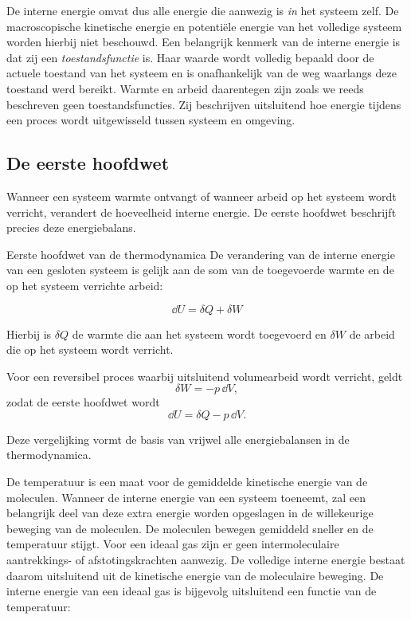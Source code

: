 De interne energie omvat dus alle energie die aanwezig is \emph{in} het systeem zelf. De macroscopische kinetische energie en potentiële energie van het volledige systeem worden hierbij niet beschouwd. Een belangrijk kenmerk van de interne energie is dat zij een \emph{toestandsfunctie} is. Haar waarde wordt volledig bepaald door de actuele toestand van het systeem en is onafhankelijk van de weg waarlangs deze toestand werd bereikt. Warmte en arbeid daarentegen zijn zoals we reeds beschreven geen toestandsfuncties. Zij beschrijven uitsluitend hoe energie tijdens een proces wordt uitgewisseld tussen systeem en omgeving.

\subsection{De eerste hoofdwet}

Wanneer een systeem warmte ontvangt of wanneer arbeid op het systeem wordt verricht, verandert de hoeveelheid interne energie. De eerste hoofdwet beschrijft precies deze energiebalans.

\begin{definitie}{Eerste hoofdwet van de thermodynamica}
De verandering van de interne energie van een gesloten systeem is gelijk aan de som van de toegevoerde warmte en de op het systeem verrichte arbeid:

\begin{equation}
\boxed{
\dd U = \delta Q + \delta W
}
\end{equation}

Hierbij is $\delta Q$ de warmte die aan het systeem wordt toegevoerd en $\delta W$ de arbeid die op het systeem wordt verricht.
\end{definitie}

Voor een reversibel proces waarbij uitsluitend volumearbeid wordt verricht, geldt
\[
\delta W=-p\,\dd V,
\]
zodat de eerste hoofdwet wordt
\begin{equation}
\boxed{
\dd U
=
\delta Q
-
p\,\dd V.
}
\end{equation}

Deze vergelijking vormt de basis van vrijwel alle energiebalansen in de thermodynamica.

De temperatuur is een maat voor de gemiddelde kinetische energie van de moleculen. Wanneer de interne energie van een systeem toeneemt, zal een belangrijk deel van deze extra energie worden opgeslagen in de willekeurige beweging van de moleculen. De moleculen bewegen gemiddeld sneller en de temperatuur stijgt. Voor een ideaal gas zijn er geen intermoleculaire aantrekkings- of afstotingskrachten aanwezig. De volledige interne energie bestaat daarom uitsluitend uit de kinetische energie van de moleculaire beweging. De interne energie van een ideaal gas is bijgevolg uitsluitend een functie van de temperatuur:

